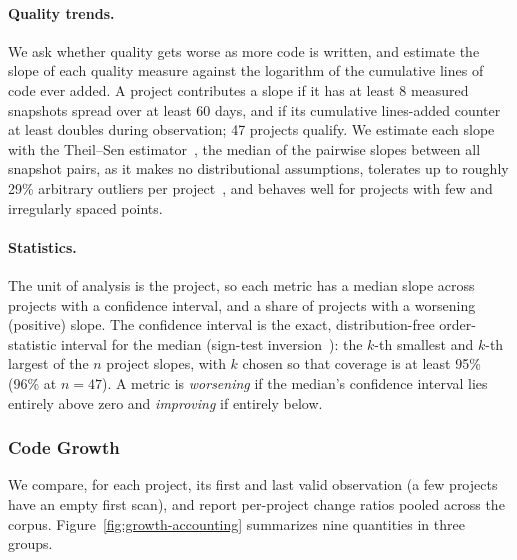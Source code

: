 \documentclass[smallextended]{svjour3}
\begin{document}
\paragraph{Quality trends.}
We ask whether quality gets worse as more code is written, and estimate
the slope of each quality measure against the logarithm of the cumulative
lines of code ever added. A project contributes a slope if it has at least
8 measured snapshots spread over at least 60 days, and if its cumulative
lines-added counter at least doubles during observation; 47 projects
qualify. We estimate each slope with the Theil--Sen
estimator~\cite{theil1950,sen1968}, the median of the pairwise slopes
between all snapshot pairs, as it makes no distributional assumptions,
tolerates up to roughly 29\% arbitrary outliers per
project~\cite{rousseeuw1987}, and behaves well for projects with few and
irregularly spaced points.

\paragraph{Statistics.}
The unit of analysis is the project, so each metric has a median slope
across projects with a confidence interval, and a share of projects with a
worsening (positive) slope. The confidence interval is the exact,
distribution-free order-statistic interval for the median (sign-test
inversion~\cite{hollander1973}): the $k$-th smallest and $k$-th largest of
the $n$ project slopes, with $k$ chosen so that coverage is at least 95\%
(96\% at $n=47$). A metric is \emph{worsening} if the median's confidence
interval lies entirely above zero and \emph{improving} if entirely below.

\subsubsection{Code Growth}

We compare, for each project, its first and last valid observation (a few projects have an
empty first scan), and report per-project change ratios pooled across
the corpus. Figure~\ref{fig:growth-accounting} summarizes nine
quantities in three groups.
\end{document}

